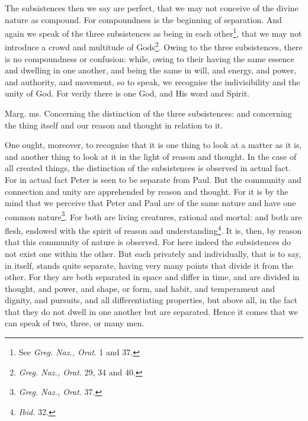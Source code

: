 The subsistences then we say are perfect, that we may not conceive of the divine nature as compound. For compoundness is the beginning of separation. And again we speak of the three subsistences as being in each other\footnote{See \emph{Greg. Naz., Orat}. 1 and 37.}, that we may not introduce a crowd and multitude of Gods\footnote{\emph{Greg. Naz., Orat}. 29, 34 and 40.}. Owing to the three subsistences, there is no compoundness or confusion: while, owing to their having the same essence and dwelling in one another, and being the same in will, and energy, and power, and authority, and movement, so to speak, we recognise the indivisibility and the unity of God. For verily there is one God, and His word and Spirit.

Marg. ms. Concerning the distinction of the three subsistences: and concerning the thing itself and our reason and thought in relation to it.

One ought, moreover, to recognise that it is one thing to look at a matter as it is, and another thing to look at it in the light of reason and thought. In the case of all created things, the distinction of the subsistences is observed in actual fact. For in actual fact Peter is seen to be separate from Paul. But the community and connection and unity are apprehended by reason and thought. For it is by the mind that we perceive that Peter and Paul are of the same nature and have one common nature\footnote{\emph{Greg. Naz., Orat}. 37.}. For both are living creatures, rational and mortal: and both are flesh, endowed with the spirit of reason and understanding\footnote{\emph{Ibid. }32.}. It is, then, by reason that this community of nature is observed. For here indeed the subsistences do not exist one within the other. But each privately and individually, that is to say, in itself, stands quite separate, having very many points that divide it from the other. For they are both separated in space and differ in time, and are divided in thought, and power, and shape, or form, and habit, and temperament and dignity, and pursuits, and all differentiating properties, but above all, in the fact that they do not dwell in one another but are separated. Hence it comes that we can speak of two, three, or many men.

